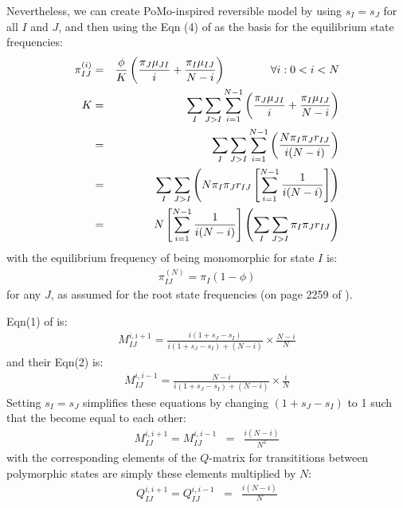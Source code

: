 \documentclass{llncs}
\newcommand{\polyProb}{\ensuremath{\phi}}
\newcommand{\Knorm}{\ensuremath{K}}
\newcommand{\pomo}{PoMo\xspace}
\begin{document}
Nevertheless, we can create \pomo-inspired reversible model by using
    $s_I= s_J$ for all $I$ and $J$, and then using the Eqn (4) of \cite{DeMaioSK2013}
    as the basis for the equilibrium state frequencies:
\begin{eqnarray}
\pi_{IJ}^{(i)} & = & \frac{\polyProb}{\Knorm }\left(
    \frac{\pi_J\mu_{JI}}{i} + \frac{\pi_I\mu_{IJ}}{N-i}\right) \hskip 4em \forall i: 0<i<N \label{stateFreqPoly}\\
    \Knorm  & = & \sum_I \sum_{J > I}\sum_{i=1}^{N-1} \left(
    \frac{\pi_J\mu_{JI}}{i} + \frac{\pi_I\mu_{IJ}}{N-i}\right) \\
    & = & \sum_I \sum_{J > I}\sum_{i=1}^{N-1} \left(
    \frac{N\pi_I\pi_J r_{IJ}}{i(N-i)}\right) \\
    & = & \sum_I \sum_{J > I}\left(N\pi_I\pi_J r_{IJ} \left[\sum_{i=1}^{N-1} \frac{1}{i(N-i)}\right]\right) \\
    & = &  N\left[\sum_{i=1}^{N-1} \frac{1}{i(N-i)}\right]\left(\sum_I \sum_{J > I}\pi_I\pi_J r_{IJ}\right) \label{KnormDef}
\end{eqnarray}
with the equilibrium frequency of being monomorphic for state $I$ is:
\begin{eqnarray}
    \pi_{IJ}^{(N)} = \pi_I(1-\polyProb) \label{monoStateFreq}
\end{eqnarray}
for any $J$,
as assumed for the root state frequencies (on page 2259 of \cite{DeMaioSK2013}).

Eqn(1) of \cite{DeMaioSK2013} is:
\begin{eqnarray}
 M_{IJ}^{i,i+1}  = \frac{i(1 + s_J - s_I)}{i(1 + s_J - s_I)+(N-i)}\times\frac{N-i}{N}
\end{eqnarray}
and their Eqn(2) is:
\begin{eqnarray}
 M_{IJ}^{i,i-1}  = \frac{N-i}{i(1 + s_J - s_I)+(N-i)}\times\frac{i}{N}
\end{eqnarray}
Setting $s_I=s_J$ simplifies these equations by changing $(1 + s_J - s_I)$ to 1 such that the become equal to each other:
\begin{eqnarray}
 M_{IJ}^{i,i+1}  = M_{IJ}^{i,i-1} & = & \frac{i(N-i)}{N^2}
\end{eqnarray}
with the corresponding elements of the $Q$-matrix for 
    transititions between polymorphic states are simply
    these elements multiplied by $N$:
\begin{eqnarray}
    Q_{IJ}^{i,i+1}  = Q_{IJ}^{i,i-1} & = & \frac{i(N-i)}{N} \label{polyQPair}
\end{eqnarray}
\end{document}

